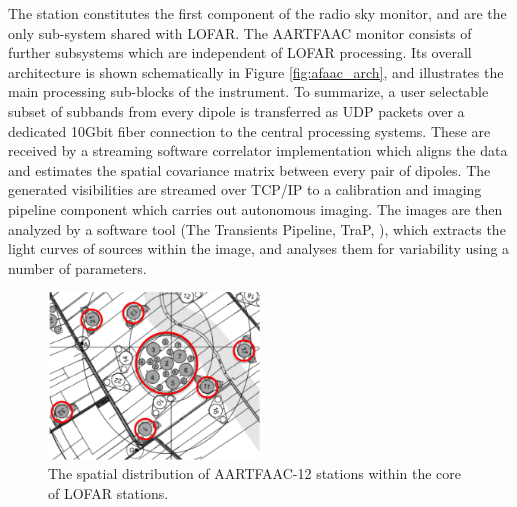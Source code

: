 \documentclass{ws-jai}
\begin{document}
The station  constitutes the first component  of the radio sky  monitor, and are
the only sub-system shared with LOFAR.  The AARTFAAC monitor consists of further
subsystems which are independent of  LOFAR processing.  Its overall architecture
is shown schematically in Figure  \ref{fig:afaac_arch}, and illustrates the main
processing sub-blocks of the instrument.  To summarize, a user selectable subset
of subbands  from every dipole  is transferred as  UDP packets over  a dedicated
10Gbit fiber connection  to the central processing systems.   These are received
by  a streaming  software correlator  implementation which  aligns the  data and
estimates  the spatial  covariance matrix  between every  pair of  dipoles.  The
generated visibilities  are streamed  over TCP/IP to  a calibration  and imaging
pipeline component  which carries out  autonomous imaging.  The images  are then
analyzed    by   a    software    tool   (The    Transients   Pipeline,    TraP,
\citep{swinbank2015lofar}), which  extracts the  light curves of  sources within
the image, and analyses them for variability using a number of parameters.


\begin{figure}[htbp]
\includegraphics[width=0.5\textwidth]{Figs/afaac12_arrayconfig.png}
\caption{The spatial distribution of AARTFAAC-12 stations within the core of LOFAR stations.}
\label{fig:afaac12_arrayconfig}
\end{figure}
\end{document}
